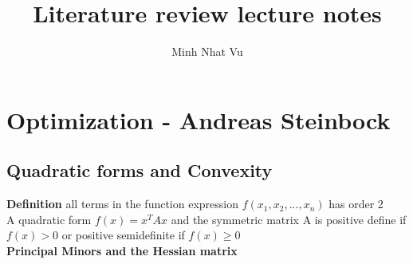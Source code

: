 \documentclass[a4paper]{article}
\title{Literature review lecture notes}
\author{Minh Nhat Vu}
\begin{document}
\maketitle
\section{Optimization - Andreas Steinbock}
\subsection{Quadratic forms and Convexity}
\textbf{Definition} all terms in the function expression $f(x_1,x_2,...,x_n)$ has order 2 \\
A quadratic form $f(x) = x^T A x$ and the symmetric matrix A is positive define if $f(x) > 0$ or positive semidefinite if   $f(x) \geq 0$ \\
\textbf{Principal Minors and the Hessian matrix}


\end{document}
